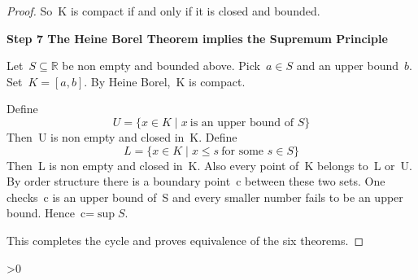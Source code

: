 \documentclass[12pt,a4paper,draft]{article}  %
\newcommand{\bibfile}{\jobname.bib}
\newcounter{cite}
\theoremstyle{definition}
\numberwithin{equation}{section}
\newcommand{\RR}{\mathbb{R}}
\begin{document}
\begin{proof}
So~K is compact if and only if it is closed and bounded.

\textbf{Step 7  The Heine Borel Theorem implies the Supremum Principle}

Let~$S\subseteq\RR$ be non empty and bounded above.
Pick~$a\in S$ and an upper bound~$b$.
Set~$K=[a,b]$.
By Heine Borel,~K is compact.

Define
\[
U=\{x\in K\mid x\ \text{is an upper bound of }S\}
\]
Then~U is non empty and closed in~K.
Define
\[
L=\{x\in K\mid x\le s\ \text{for some }s\in S\}
\]
Then~L is non empty and closed in~K.
Also every point of~K belongs to~L or~U.
By order structure there is a boundary point~c between these two sets.
One checks~c is an upper bound of~S and every smaller number fails to be an upper bound.
Hence~c=$\sup S$.

This completes the cycle and proves equivalence of the six theorems.
\end{proof}

\ifnum\value{cite}>0
    \small
    
    
\fi
\end{document}
